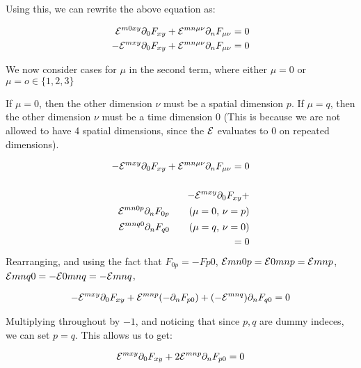 Using this, we can rewrite the above equation as:

\begin{align*}
    \mathcal{E}^{m 0 x y}  \partial_{0} F_{x y} + \mathcal{E}^{m n \mu \nu}  \partial_{n} F_{\mu \nu}  = 0 \\
    - \mathcal{E}^{m x y}  \partial_{0} F_{x y} + \mathcal{E}^{m n \mu \nu}  \partial_{n} F_{\mu \nu}  = 0 \\
\end{align*}

We now consider cases for $\mu$ in the second term, where either $\mu = 0$ or $\mu = o \in \{1, 2, 3\}$

If $\mu = 0$, then the other dimension $\nu$ must be a spatial dimension $p$.
If $\mu = q$, then the other dimension $\nu$ must be a time dimension $0$
(This is because we are not allowed to have 4 spatial dimensions, since the $\mathcal{E}$
evaluates to 0 on repeated dimensions).


\begin{align*}
    - \mathcal{E}^{m x y}  \partial_{0} F_{x y} + \mathcal{E}^{m n \mu \nu}  \partial_{n} F_{\mu \nu}  = 0 \\
    \\
    - \mathcal{E}^{m x y}  \partial_{0} F_{x y} + \\
    \mathcal{E}^{m n 0 p}  \partial_{n} F_{0 p}  \tag{$\mu = 0$, $\nu = p$} \\
    \mathcal{E}^{m n q 0}  \partial_{n} F_{q 0} \tag{$\mu = q$, $\nu = 0$} \\
    = 0 
\end{align*}
Rearranging, and using the fact that $F_{0 p} = - F {p 0}$,
$\mathcal{E}{m n 0 p} = \mathcal{E}{0 m n p} = \mathcal{E}{m n p}$,
$\mathcal{E}{m n q 0} = - \mathcal{E}{0 m n q} = - \mathcal{E}{m n q}$,

\begin{align*}
    - \mathcal{E}^{m x y}  \partial_{0} F_{x y} + 
    \mathcal{E}^{m n p}  (- \partial_{n} F_{p 0}) +
    (- \mathcal{E}^{m n q})  \partial_{n} F_{q 0}
    = 0 
\end{align*}

Multiplying throughout by $-1$, and noticing that since $p, q$ are dummy indeces,
we can set $p = q$. This allows us to get:



\begin{align*}
    \mathcal{E}^{m x y}  \partial_{0} F_{x y} + 
    2 \mathcal{E}^{m n p}   \partial_{n} F_{p 0} = 0
\end{align*}

